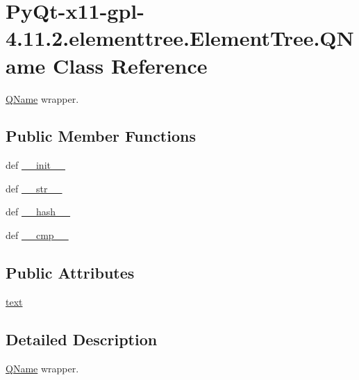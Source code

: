 \hypertarget{classPyQt-x11-gpl-4_811_82_1_1elementtree_1_1ElementTree_1_1QName}{}\section{Py\+Qt-\/x11-\/gpl-\/4.11.2.elementtree.\+Element\+Tree.\+Q\+Name Class Reference}
\label{classPyQt-x11-gpl-4_811_82_1_1elementtree_1_1ElementTree_1_1QName}


\hyperlink{classPyQt-x11-gpl-4_811_82_1_1elementtree_1_1ElementTree_1_1QName}{Q\+Name} wrapper.  


\subsection*{Public Member Functions}
\begin{DoxyCompactItemize}
\item 
def \hyperlink{classPyQt-x11-gpl-4_811_82_1_1elementtree_1_1ElementTree_1_1QName_ab87a35c815c374081429360db61769c8}{\+\_\+\+\_\+init\+\_\+\+\_\+}
\item 
def \hyperlink{classPyQt-x11-gpl-4_811_82_1_1elementtree_1_1ElementTree_1_1QName_a4e0b5f05b749e842705473f46025a748}{\+\_\+\+\_\+str\+\_\+\+\_\+}
\item 
def \hyperlink{classPyQt-x11-gpl-4_811_82_1_1elementtree_1_1ElementTree_1_1QName_af4168ce457cffc284757ddd946f5f73b}{\+\_\+\+\_\+hash\+\_\+\+\_\+}
\item 
def \hyperlink{classPyQt-x11-gpl-4_811_82_1_1elementtree_1_1ElementTree_1_1QName_af2937f98036485cff7e5156aa7d95a83}{\+\_\+\+\_\+cmp\+\_\+\+\_\+}
\end{DoxyCompactItemize}
\subsection*{Public Attributes}
\begin{DoxyCompactItemize}
\item 
\hyperlink{classPyQt-x11-gpl-4_811_82_1_1elementtree_1_1ElementTree_1_1QName_ac596410489aef4353ed75aee430d0b2a}{text}
\end{DoxyCompactItemize}


\subsection{Detailed Description}
\hyperlink{classPyQt-x11-gpl-4_811_82_1_1elementtree_1_1ElementTree_1_1QName}{Q\+Name} wrapper. 

